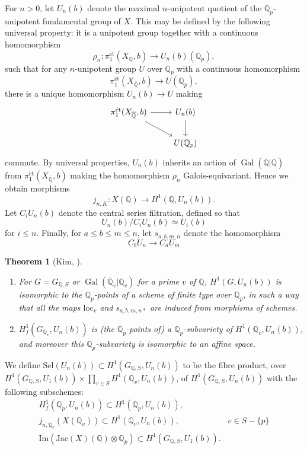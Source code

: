 \documentclass[11pt]{amsart}
\def\Q{\mathbb Q}
\theoremstyle{plain}
\newtheorem{theorem}{Theorem}
\theoremstyle{definition}
\DeclareMathOperator{\Gal}{Gal}
\newcommand{\Sel}{\mathrm{Sel}}
\newcommand{\Jac}{\mathrm{Jac}}
\newcommand{\et}{\mathrm{\acute{e}t}}
\newcommand{\loc}{\mathrm{loc}}
\begin{document}
For $n>0$, let $U_n (b)$ denote the maximal $n$-unipotent quotient of the $\Q _p $-unipotent fundamental group of $X$. This may be defined by the following universal property: it is a unipotent group together with a continuous homomorphism
\[
\rho _n :\pi _1 ^{\et }(X_{\overline{\Q }},b)\to U_n (b)(\Q _p ),
\]
such that for any $n$-unipotent group $U$ over $\Q _p $ with a continuous homomorphism 
\[
\pi _1 ^{\et }(X_{\overline{\Q }},b) \to U(\Q _p ),
\]
there is a unique homomorphism $U_n (b)\to U$ making 
\[
\begin{tikzcd}
\pi _1 ^{\et }(X_{\overline{\Q }},b) \arrow[r] \arrow[rd] & U_n (b) \arrow[d] \\
                       & U(\Q _p )                  
\end{tikzcd}
\]
commute. By universal properties, $U_n (b)$ inherits an action of $\Gal (\overline{\Q }|\Q )$ from $\pi _1 ^{\et }(X_{\overline{\Q }},b)$ making the homomorphism $\rho _n$ Galois-equivariant. Hence we obtain morphisms
\[
j_{n,K}:X(\Q )\to H^1 (\Q ,U_n (b)).
\]
Let $C_i U_n (b)$ denote the central series filtration, defined so that 
\[
U_n (b)/C_i U_n (b)\simeq U_i (b)
\]
for $i\leq n$. Finally, for $a\leq b\leq m\leq n$, let $s_{a,b,m,n}$ denote the homomorphism
\[
C_b U_n \to C_a U_m
\]
\begin{theorem}[Kim, \cite{kim:siegel}]
\begin{enumerate}
\item For $G=G_{\Q ,S}$ or $\Gal (\overline{\Q } _v |\Q _v )$ for a prime $v$ of $\Q $, $H^1 (G,U_n (b))$ is isomorphic to the $\Q _p$-points of a scheme of finite type over $\Q _p$, in such a way that all the maps $\loc _v$ and $s_{a,b,m,n*}$ are induced from morphisms of schemes.
\item $H^1 _f (G_{\Q _v },U_n (b))$ is (the $\Q _p $-points of) a $\Q _p$-subvariety of $H^1 (\Q _v ,U_n (b))$, and moreover this $\Q _p$-subvariety is isomorphic to an affine space.
\end{enumerate}
\end{theorem}
We define $\Sel (U_n (b))\subset H^1 (G_{\Q ,S},U_n (b))$ to be the fibre product, over $H^1 (G_{\Q ,S},U_1 (b))\times \prod _{v\in S}H^1 (\Q _v ,U_n (b))$, of $H^1 (G_{\Q ,S},U_n (b))$ with the following subschemes:
\begin{align*}
H^1 _f (\Q _p ,U_n (b))\subset H^1 (\Q _p ,U_n (b)), \\
j_{n,\Q _v }(X(\Q _v ))\subset H^1 (\Q _v ,U_n (b)), & v\in S-\{p\} \\
\mathrm{Im}(\Jac (X)(\Q )\otimes \Q _p )\subset H^1 (G_{\Q ,S},U_1 (b)). &  \\
\end{align*}
\end{document}
